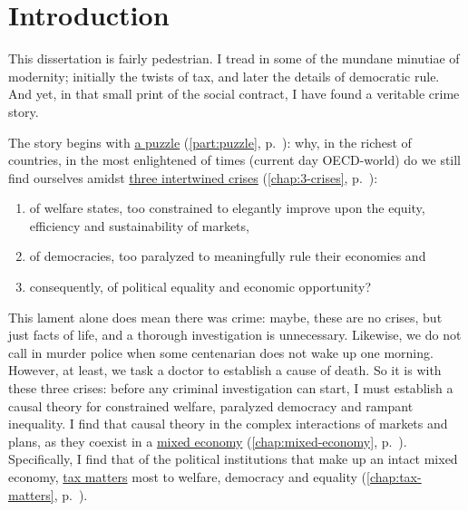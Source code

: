 
\chapter{Introduction} \label{chap:introduction-phd}



This dissertation is fairly pedestrian.
I tread in some of the mundane minutiae of modernity;
initially the twists of tax, and later the details of democratic rule.
And yet, in that small print of the social contract, I have found a veritable crime story.

The story begins with \hyperref[part:puzzle]{a puzzle} (\autoref{part:puzzle}, p.~\pageref{part:puzzle}):
why, in the richest of countries, in the most enlightened of times (current day \gls{OECD}-world) do we still find ourselves amidst \hyperref[chap:3-crises]{three intertwined crises} (\autoref{chap:3-crises}, p.~\pageref{chap:3-crises}):
\begin{enumerate}
	\item
		of welfare states, too constrained to elegantly improve upon the equity, efficiency and sustainability of markets,
	\item
		of democracies, too paralyzed to meaningfully rule their economies and
	\item
		consequently, of political equality and economic opportunity?
\end{enumerate}
This lament alone does mean there was crime:
maybe, these are no crises, but just facts of life, and a thorough investigation is unnecessary.
Likewise, we do not call in murder police when some centenarian does not wake up one morning.
However, at least, we task a doctor to establish a cause of death.
So it is with these three crises:
before any criminal investigation can start, I must establish a causal theory for constrained welfare, paralyzed democracy and rampant inequality.
I find that causal theory in the complex interactions of markets and plans, as they coexist in a \hyperref[chap:mixed-economy]{mixed economy} (\autoref{chap:mixed-economy}, p.~\pageref{chap:mixed-economy}).
Specifically, I find that of the political institutions that make up an intact mixed economy, \hyperref[chap:tax-matters]{tax matters} most to welfare, democracy and equality (\autoref{chap:tax-matters}, p.~\pageref{chap:tax-matters}).

